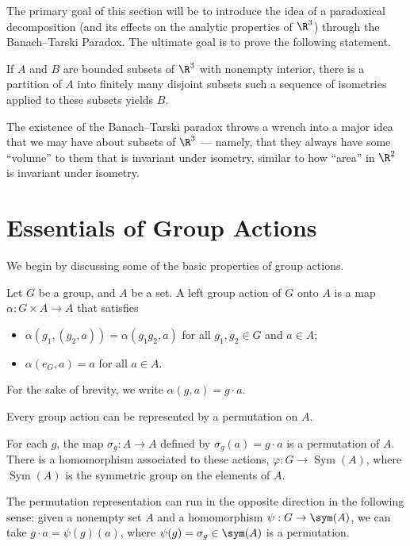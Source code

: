 The primary goal of this section will be to introduce the idea of a paradoxical decomposition (and its effects on the analytic properties of $\R^3$) through the Banach--Tarski Paradox. The ultimate goal is to prove the following statement.
\begin{proposition}\label{prop:banachtarski}
  If $A$ and $B$ are bounded subsets of $\R^3$ with nonempty interior, there is a partition of $A$ into finitely many disjoint subsets such a sequence of isometries applied to these subsets yields $B$.
\end{proposition}
The existence of the Banach--Tarski paradox throws a wrench into a major idea that we may have about subsets of $\R^3$ --- namely, that they always have some ``volume'' to them that is invariant under isometry, similar to how ``area'' in $\R^2$ is invariant under isometry.
\section{Essentials of Group Actions}
We begin by discussing some of the basic properties of group actions.
\begin{definition}
  Let $G$ be a group, and $A$ be a set. A left group action of $G$ onto $A$ is a map $\alpha: G\times A\rightarrow A$ that satisfies
  \begin{itemize}
    \item $\alpha\left(g_1,\left(g_2,a\right)\right) = \alpha\left(g_1g_2,a\right)$ for all $g_1,g_2\in G$ and $a\in A$;
    \item $\alpha\left(e_G,a\right) = a$ for all $a\in A$.
  \end{itemize}
  For the sake of brevity, we write $\alpha \left(g,a\right) = g\cdot a$.
\end{definition}
Every group action can be represented by a permutation on $A$.
\begin{definition}
  For each $g$, the map $\sigma_g: A\rightarrow A$ defined by $\sigma_g\left(a\right) = g\cdot a$ is a permutation of $A$. There is a homomorphism associated to these actions, $\varphi: G\rightarrow \operatorname{Sym}(A)$, where $\operatorname{Sym}(A)$ is the symmetric group on the elements of $A$.
\end{definition}
The permutation representation can run in the opposite direction in the following sense: given a nonempty set $A$ and a homomorphism $\psi: G\rightarrow \sym(A)$, we can take $g\cdot a = \psi(g)(a)$, where $\psi(g) = \sigma_g\in \sym(A)$ is a permutation.\newline

